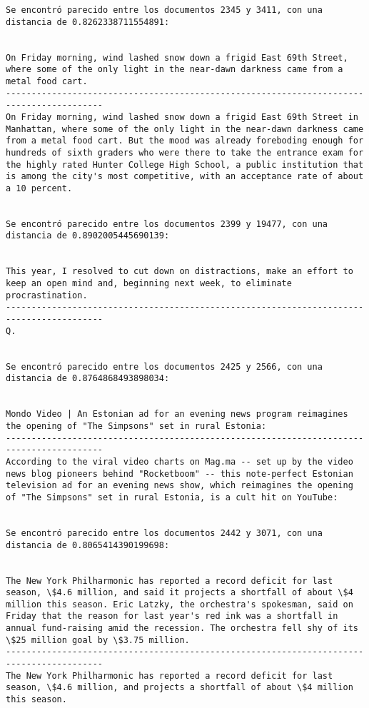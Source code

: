 \documentclass[11pt]{article}
\begin{document}
\begin{Verbatim}[commandchars=\\\{\}]
Se encontró parecido entre los documentos 2345 y 3411, con una distancia de 0.8262338711554891:


On Friday morning, wind lashed snow down a frigid East 69th Street, where some of the only light in the near-dawn darkness came from a metal food cart.
-----------------------------------------------------------------------------------------
On Friday morning, wind lashed snow down a frigid East 69th Street in Manhattan, where some of the only light in the near-dawn darkness came from a metal food cart. But the mood was already foreboding enough for hundreds of sixth graders who were there to take the entrance exam for the highly rated Hunter College High School, a public institution that is among the city's most competitive, with an acceptance rate of about a 10 percent.


Se encontró parecido entre los documentos 2399 y 19477, con una distancia de 0.8902005445690139:


This year, I resolved to cut down on distractions, make an effort to keep an open mind and, beginning next week, to eliminate procrastination.
-----------------------------------------------------------------------------------------
Q.


Se encontró parecido entre los documentos 2425 y 2566, con una distancia de 0.8764868493898034:


Mondo Video | An Estonian ad for an evening news program reimagines the opening of "The Simpsons" set in rural Estonia:
-----------------------------------------------------------------------------------------
According to the viral video charts on Mag.ma -- set up by the video news blog pioneers behind "Rocketboom" -- this note-perfect Estonian television ad for an evening news show, which reimagines the opening of "The Simpsons" set in rural Estonia, is a cult hit on YouTube:


Se encontró parecido entre los documentos 2442 y 3071, con una distancia de 0.8065414390199698:


The New York Philharmonic has reported a record deficit for last season, \$4.6 million, and said it projects a shortfall of about \$4 million this season. Eric Latzky, the orchestra's spokesman, said on Friday that the reason for last year's red ink was a shortfall in annual fund-raising amid the recession. The orchestra fell shy of its \$25 million goal by \$3.75 million.
-----------------------------------------------------------------------------------------
The New York Philharmonic has reported a record deficit for last season, \$4.6 million, and projects a shortfall of about \$4 million this season.



\end{Verbatim}
\end{document}
